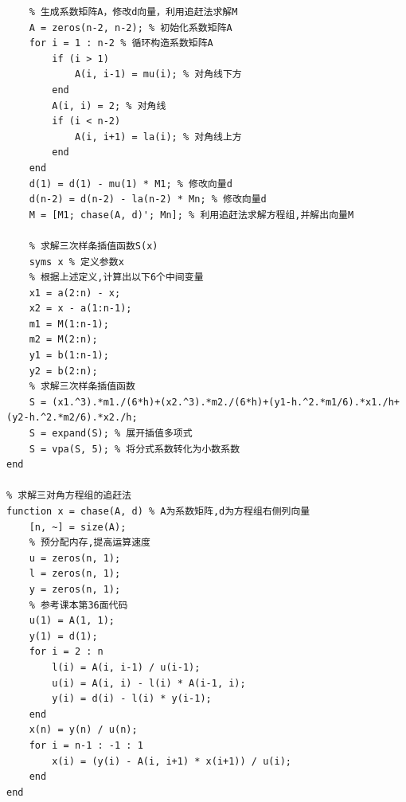 \documentclass[12pt, a4paper, oneside]{ctexart}
\begin{document}
\begin{appendices}
\begin{lstlisting}
    % 生成系数矩阵A，修改d向量，利用追赶法求解M
    A = zeros(n-2, n-2); % 初始化系数矩阵A
    for i = 1 : n-2 % 循环构造系数矩阵A
        if (i > 1)
            A(i, i-1) = mu(i); % 对角线下方
        end
        A(i, i) = 2; % 对角线
        if (i < n-2)
            A(i, i+1) = la(i); % 对角线上方
        end
    end
    d(1) = d(1) - mu(1) * M1; % 修改向量d
    d(n-2) = d(n-2) - la(n-2) * Mn; % 修改向量d
    M = [M1; chase(A, d)'; Mn]; % 利用追赶法求解方程组,并解出向量M

    % 求解三次样条插值函数S(x)
    syms x % 定义参数x
    % 根据上述定义,计算出以下6个中间变量
    x1 = a(2:n) - x;
    x2 = x - a(1:n-1);
    m1 = M(1:n-1);
    m2 = M(2:n);
    y1 = b(1:n-1);
    y2 = b(2:n);
    % 求解三次样条插值函数
    S = (x1.^3).*m1./(6*h)+(x2.^3).*m2./(6*h)+(y1-h.^2.*m1/6).*x1./h+(y2-h.^2.*m2/6).*x2./h;
    S = expand(S); % 展开插值多项式
    S = vpa(S, 5); % 将分式系数转化为小数系数
end

% 求解三对角方程组的追赶法
function x = chase(A, d) % A为系数矩阵,d为方程组右侧列向量
    [n, ~] = size(A);
    % 预分配内存,提高运算速度
    u = zeros(n, 1);
    l = zeros(n, 1);
    y = zeros(n, 1);
    % 参考课本第36面代码
    u(1) = A(1, 1);
    y(1) = d(1);
    for i = 2 : n
        l(i) = A(i, i-1) / u(i-1);
        u(i) = A(i, i) - l(i) * A(i-1, i);
        y(i) = d(i) - l(i) * y(i-1);
    end
    x(n) = y(n) / u(n);
    for i = n-1 : -1 : 1
        x(i) = (y(i) - A(i, i+1) * x(i+1)) / u(i);
    end
end
    \end{lstlisting}
\end{appendices}
\end{document}
